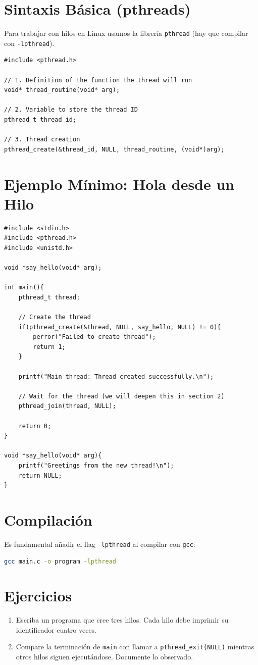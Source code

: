 \documentclass[12pt,a4paper]{article}
\begin{document}
\newpage

\section{Sintaxis Básica (pthreads)}
Para trabajar con hilos en Linux usamos la librería \texttt{pthread} (hay que compilar con \texttt{-lpthread}).

\begin{lstlisting}[numbers=none]
#include <pthread.h>

// 1. Definition of the function the thread will run
void* thread_routine(void* arg);

// 2. Variable to store the thread ID
pthread_t thread_id;

// 3. Thread creation
pthread_create(&thread_id, NULL, thread_routine, (void*)arg);
\end{lstlisting}

\section{Ejemplo Mínimo: Hola desde un Hilo}
\begin{lstlisting}
#include <stdio.h>
#include <pthread.h>
#include <unistd.h>

void *say_hello(void* arg);

int main(){
    pthread_t thread;

    // Create the thread
    if(pthread_create(&thread, NULL, say_hello, NULL) != 0){
        perror("Failed to create thread");
        return 1;
    }

    printf("Main thread: Thread created successfully.\n");
    
    // Wait for the thread (we will deepen this in section 2)
    pthread_join(thread, NULL); 

    return 0;
}

void *say_hello(void* arg){
    printf("Greetings from the new thread!\n");
    return NULL;
}

\end{lstlisting}

\section{Compilación}
Es fundamental añadir el flag \texttt{-lpthread} al compilar con \texttt{gcc}:
\begin{lstlisting}[language=bash, numbers=none]
gcc main.c -o program -lpthread
\end{lstlisting}

\section{Ejercicios}
\begin{enumerate}
    \item Escriba un programa que cree tres hilos. Cada hilo debe imprimir su identificador cuatro veces.
    \item Compare la terminación de \texttt{main} con llamar a \texttt{pthread\_exit(NULL)} mientras otros hilos siguen ejecutándose. Documente lo observado.
\end{enumerate}
\end{document}
